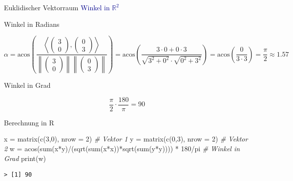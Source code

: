 \documentclass[
  8pt,
  ignorenonframetext,
]{beamer}
\newenvironment{Shaded}{\begin{snugshade}}{\end{snugshade}}
\newcommand{\AttributeTok}[1]{\textcolor[rgb]{0.77,0.63,0.00}{#1}}
\newcommand{\CommentTok}[1]{\textcolor[rgb]{0.56,0.35,0.01}{\textit{#1}}}
\newcommand{\DecValTok}[1]{\textcolor[rgb]{0.00,0.00,0.81}{#1}}
\newcommand{\FunctionTok}[1]{\textcolor[rgb]{0.00,0.00,0.00}{#1}}
\newcommand{\NormalTok}[1]{#1}
\newcommand{\OtherTok}[1]{\textcolor[rgb]{0.56,0.35,0.01}{#1}}
\newcommand{\SpecialCharTok}[1]{\textcolor[rgb]{0.00,0.00,0.00}{#1}}
\begin{document}
\begin{frame}[fragile]{Euklidischer Vektorraum}
\protect\hypertarget{euklidischer-vektorraum-11}{}
\textcolor{darkblue}{Winkel in $\mathbb{R}^2$}

\footnotesize

Winkel in Radians

\tiny

\begin{equation}
\alpha
= \mbox{acos}
\left(\frac{\left\langle \begin{pmatrix} 3 \\ 0 \end{pmatrix}, \begin{pmatrix} 0 \\ 3 \end{pmatrix} \right\rangle}
           {\left\lVert  \begin{pmatrix} 3 \\ 0 \end{pmatrix} \right\rVert \left\lVert \begin{pmatrix} 0 \\ 3 \end{pmatrix} \right\rVert}
\right)
= \mbox{acos}
\left(\frac{3\cdot 0 + 0 \cdot 3}
           {\sqrt{3^2 + 0^2} \cdot \sqrt{0^2 + 3^2}}
\right)
= \mbox{acos}
\left(\frac{0}
           {3 \cdot 3}
\right)
= \frac{\pi}{2}
\approx 1.57
\end{equation}

\footnotesize

Winkel in Grad

\begin{equation}
\frac{\pi}{2} \cdot \frac{180}{\pi} = 90
\end{equation}

Berechnung in R

\begin{Shaded}
\begin{Highlighting}[]
\NormalTok{x }\OtherTok{=} \FunctionTok{matrix}\NormalTok{(}\FunctionTok{c}\NormalTok{(}\DecValTok{3}\NormalTok{,}\DecValTok{0}\NormalTok{), }\AttributeTok{nrow =} \DecValTok{2}\NormalTok{)                                    }\CommentTok{\# Vektor 1}
\NormalTok{y }\OtherTok{=} \FunctionTok{matrix}\NormalTok{(}\FunctionTok{c}\NormalTok{(}\DecValTok{0}\NormalTok{,}\DecValTok{3}\NormalTok{), }\AttributeTok{nrow =} \DecValTok{2}\NormalTok{)                                    }\CommentTok{\# Vektor 2}
\NormalTok{w }\OtherTok{=} \FunctionTok{acos}\NormalTok{(}\FunctionTok{sum}\NormalTok{(x}\SpecialCharTok{*}\NormalTok{y)}\SpecialCharTok{/}\NormalTok{(}\FunctionTok{sqrt}\NormalTok{(}\FunctionTok{sum}\NormalTok{(x}\SpecialCharTok{*}\NormalTok{x))}\SpecialCharTok{*}\FunctionTok{sqrt}\NormalTok{(}\FunctionTok{sum}\NormalTok{(y}\SpecialCharTok{*}\NormalTok{y)))) }\SpecialCharTok{*} \DecValTok{180}\SpecialCharTok{/}\NormalTok{pi     }\CommentTok{\# Winkel in Grad}
\FunctionTok{print}\NormalTok{(w)}
\end{Highlighting}
\end{Shaded}

\begin{verbatim}
> [1] 90
\end{verbatim}
\end{frame}
\end{document}
